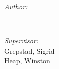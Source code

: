 \begin{titlepage}
	\begin{minipage}{0.4\textwidth}
		\begin{flushleft} \large
			\emph{Author:}\\
			\theauthor
		\end{flushleft}
	\end{minipage}~
	\begin{minipage}{0.4\textwidth}
		\begin{flushright} \large
			\emph{Supervisor:} \\
			Grepstad, Sigrid\\  %
			Heap, Winston %
		\end{flushright}
	\end{minipage}\\[2 cm]
	
	{\large \thedate}\\[2 cm]
 
	\vfill
	
\end{titlepage}